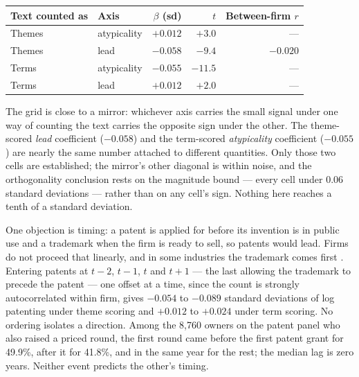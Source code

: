 \begin{center}\small
\begin{tabular}{llrrr}
\toprule
Text counted as & Axis & $\beta$ (sd) & $t$ & Between-firm $r$ \\
\midrule
Themes & atypicality & $+0.012$ & $+3.0$ & --- \\
Themes & lead        & $-0.058$ & $-9.4$ & $-0.020$ \\
Terms  & atypicality & $-0.055$ & $-11.5$ & --- \\
Terms  & lead        & $+0.012$ & $+2.0$ & --- \\
\bottomrule
\end{tabular}
\end{center}

\noindent The grid is close to a mirror: whichever axis carries the small
signal under one way of counting the text carries the opposite sign under
the other. The theme-scored \emph{lead} coefficient ($-0.058$) and the
term-scored \emph{atypicality} coefficient ($-0.055$) are nearly the same
number attached to different quantities. Only those two cells are
established; the mirror's other diagonal is within noise, and the
orthogonality conclusion rests on the magnitude bound --- every cell
under $0.06$ standard deviations --- rather than on any cell's sign.
Nothing here reaches a tenth of a standard deviation.

One objection is timing: a patent is applied for before its invention is
in public use and a trademark when the firm is ready to sell, so patents
would lead. Firms do not proceed that linearly, and in some industries the
trademark comes first \citep{Seip2018}. Entering patents at $t-2$, $t-1$,
$t$ and $t+1$ --- the last allowing the trademark to precede the patent
--- one offset at a time, since the count is strongly autocorrelated
within firm, gives $-0.054$ to $-0.089$ standard deviations of log
patenting under theme scoring and $+0.012$ to $+0.024$ under term
scoring. No ordering isolates a direction. Among the 8{,}760 owners on
the patent panel who also raised a priced round, the first round came
before the first patent grant for 49.9\%, after it for 41.8\%, and in the
same year for the rest; the median lag is zero years. Neither event
predicts the other's timing.

